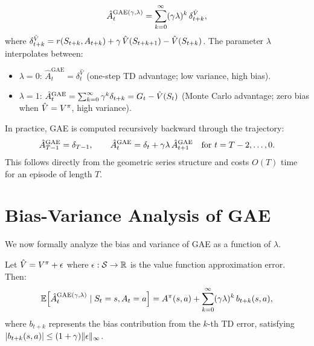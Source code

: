 \documentclass[11pt,a4paper]{article}
\begin{document}
\begin{keyresult}[title={Generalized Advantage Estimation}]
\[
  \hat{A}_t^{\mathrm{GAE}(\gamma,\lambda)}
  = \sum_{k=0}^{\infty} (\gamma\lambda)^k\, \delta_{t+k}^{\hat{V}},
\]
where $\delta_{t+k}^{\hat{V}} = r(S_{t+k}, A_{t+k}) + \gamma\,
\hat{V}(S_{t+k+1}) - \hat{V}(S_{t+k})$. The parameter $\lambda$
interpolates between:
\begin{itemize}
  \item $\lambda = 0$: $\hat{A}_t^{\mathrm{GAE}} = \delta_t^{\hat{V}}$
    (one-step TD advantage; low variance, high bias).
  \item $\lambda = 1$: $\hat{A}_t^{\mathrm{GAE}} = \sum_{k=0}^{\infty}
    \gamma^k \delta_{t+k} = G_t - \hat{V}(S_t)$ (Monte Carlo
    advantage; zero bias when $\hat{V} = V^{\pi}$, high variance).
\end{itemize}
\end{keyresult}

\begin{remark}
\label{rem:recursive-gae}
In practice, GAE is computed recursively backward through the trajectory:
\[
  \hat{A}_{T-1}^{\mathrm{GAE}} = \delta_{T-1}, \qquad
  \hat{A}_t^{\mathrm{GAE}} = \delta_t + \gamma\lambda\,
  \hat{A}_{t+1}^{\mathrm{GAE}} \quad \text{for } t = T-2, \ldots, 0.
\]
This follows directly from the geometric series structure and costs
$O(T)$ time for an episode of length $T$.
\end{remark}

\section{Bias-Variance Analysis of GAE}

We now formally analyze the bias and variance of GAE as a function of
$\lambda$.

\begin{theorem}
\label{thm:gae-bias}
Let $\hat{V} = V^{\pi} + \epsilon$ where $\epsilon : \mathcal{S} \to \mathbb{R}$ is
the value function approximation error. Then:
\[
  \mathbb{E}\!\left[\hat{A}_t^{\mathrm{GAE}(\gamma,\lambda)} \mid S_t = s, A_t = a\right]
  = A^\pi(s,a) + \sum_{k=0}^{\infty} (\gamma\lambda)^k\,
  b_{t+k}(s,a),
\]
where $b_{t+k}$ represents the bias contribution from the $k$-th TD
error, satisfying $|b_{t+k}(s,a)| \leq (1 + \gamma)\|\epsilon\|_\infty$.
\end{theorem}
\end{document}

